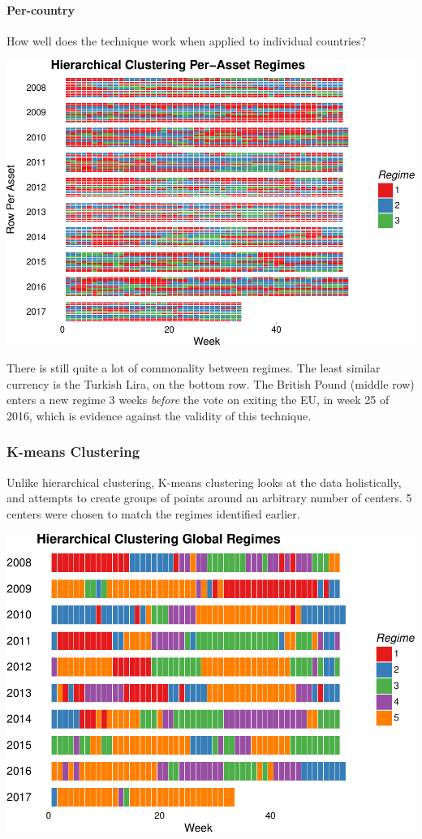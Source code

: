\documentclass[]{article}
\let\oldparagraph\paragraph
\renewcommand{\paragraph}[1]{\oldparagraph{#1}\mbox{}}
\begin{document}
\paragraph{Per-country}\label{per-country}

How well does the technique work when applied to individual countries?

\includegraphics{Econometric_FX_Forecasting_files/figure-latex/per_asset_hclust-1.pdf}

There is still quite a lot of commonality between regimes. The least
similar currency is the Turkish Lira, on the bottom row. The British
Pound (middle row) enters a new regime 3 weeks \emph{before} the vote on
exiting the EU, in week 25 of 2016, which is evidence against the
validity of this technique.

\subsubsection{K-means Clustering}\label{k-means-clustering}

Unlike hierarchical clustering, K-means clustering looks at the data
holistically, and attempts to create groups of points around an
arbitrary number of centers. 5 centers were chosen to match the regimes
identified earlier.

\includegraphics{Econometric_FX_Forecasting_files/figure-latex/global_kmean-1.pdf}
\end{document}
